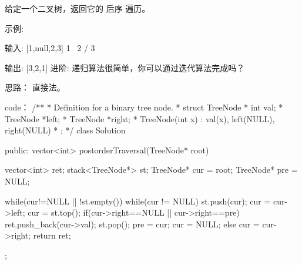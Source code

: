 给定一个二叉树，返回它的 后序 遍历。

示例:

输入: [1,null,2,3]  
   1
    \
     2
    /
   3 

输出: [3,2,1]
进阶: 递归算法很简单，你可以通过迭代算法完成吗？

























思路：
直接法。























code：
/**
 * Definition for a binary tree node.
 * struct TreeNode {
 *     int val;
 *     TreeNode *left;
 *     TreeNode *right;
 *     TreeNode(int x) : val(x), left(NULL), right(NULL) {}
 * };
 */
class Solution {
public:
    vector<int> postorderTraversal(TreeNode* root) {
        vector<int> ret;
        stack<TreeNode*> st;
        TreeNode* cur = root;
        TreeNode* pre = NULL;
        
        while(cur!=NULL || !st.empty())
        {
            while(cur != NULL)
            {
                st.push(cur);
                cur = cur->left;
            }
            cur = st.top();
            if(cur->right==NULL || cur->right==pre)
            {
                ret.push_back(cur->val);
                st.pop();
                pre = cur;
                cur = NULL;
            }
            else cur = cur->right;
        }
        return ret;
    }
};